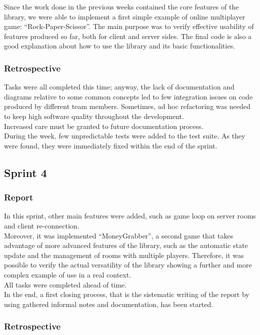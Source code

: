 Since the work done in the previous weeks contained the core features of the library, we were able to implement a first simple example of online multiplayer game: ``Rock-Paper-Scissor''. 
The main purpose was to verify effective usability of features produced so far, both for client and server sides.
The final code is also a good explanation about how to use the library and its basic functionalities.


\subsubsection{Retrospective}
Tasks were all completed this time; anyway, the lack of documentation and diagrams relative to some common concepts led to few integration issues on code produced by different team members. Sometimes, ad hoc refactoring was needed to keep high software quality throughout the development.
\\
Increased care must be granted to future documentation process.
\\
During the week, few unpredictable tests were added to the test suite.
As they were found, they were immediately fixed within the end of the sprint.




\subsection{Sprint 4}
\subsubsection{Report}
In this sprint, other main features were added, such as game loop on server rooms and client re-connection.
\\
Moreover, it was implemented ``MoneyGrabber'', a second game that takes advantage of more advanced features of the library, such as the automatic state update and the management of rooms with multiple players.
Therefore, it was possible to verify the actual versatility of the library showing a further and more complex example of use in a real context.
\\
All tasks were completed ahead of time.
\\
In the end, a first closing process, that is the sistematic writing of the report by using gathered informal notes and documentation, has been started.

\subsubsection{Retrospective}


